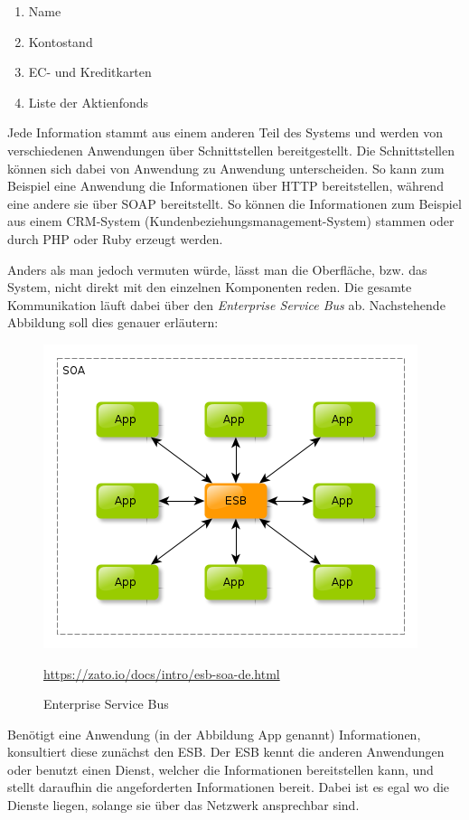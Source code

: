 \begin{enumerate}
    \item Name
    \item Kontostand
    \item EC- und Kreditkarten
    \item Liste der Aktienfonds
\end{enumerate}

Jede Information stammt aus einem anderen Teil des Systems und werden von verschiedenen Anwendungen über Schnittstellen bereitgestellt. Die Schnittstellen können sich dabei von Anwendung zu Anwendung unterscheiden. So kann zum Beispiel eine Anwendung die Informationen über HTTP bereitstellen, während eine andere sie über SOAP bereitstellt. So können die Informationen zum Beispiel aus einem CRM-System (Kundenbeziehungsmanagement-System) stammen oder durch PHP oder Ruby erzeugt werden.

Anders als man jedoch vermuten würde, lässt man die Oberfläche, bzw. das System, nicht direkt mit den einzelnen Komponenten reden. Die gesamte Kommunikation läuft dabei über den \textit{Enterprise Service Bus} ab. Nachstehende Abbildung soll dies genauer erläutern:

\begin{figure}[htb]
    \centering 
    \includegraphics[width=\linewidth]{content/images/esb-ok}\
    \caption[ESB]{Enterprise Service Bus}
    \quelle\url{https://zato.io/docs/intro/esb-soa-de.html}
    \label{fig:esb}  
\end{figure}
\newpage
Benötigt eine Anwendung (in der Abbildung App genannt) Informationen, konsultiert diese zunächst den ESB. Der ESB kennt die anderen Anwendungen oder benutzt einen Dienst, welcher die Informationen bereitstellen kann, und stellt daraufhin die angeforderten Informationen bereit. Dabei ist es egal wo die Dienste liegen, solange sie über das Netzwerk ansprechbar sind.